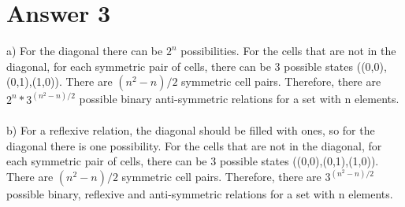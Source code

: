 \documentclass[12pt]{article}
\begin{document}
\section*{Answer 3}
a) For the diagonal there can be $2^n$ possibilities. For the cells that are not in the diagonal, for each symmetric pair of cells, there can be 3 possible states ((0,0),(0,1),(1,0)). There are $(n^2-n)/2$ symmetric cell pairs. Therefore, there are $2^n * 3^{(n^2-n)/2}$ possible binary anti-symmetric relations for a set with n elements.\\\\b) For a reflexive relation, the diagonal should be filled with ones, so for the diagonal there is one possibility. For the cells that are not in the diagonal, for each symmetric pair of cells, there can be 3 possible states ((0,0),(0,1),(1,0)). There are $(n^2-n)/2$ symmetric cell pairs. Therefore, there are $3^{(n^2-n)/2}$ possible binary, reflexive and anti-symmetric relations for a set with n elements.
\end{document}
